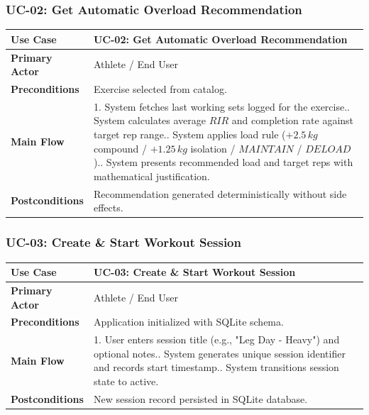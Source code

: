 \subsubsection{UC-02: Get Automatic Overload Recommendation}
\begin{table}[h!]
\centering
\small
\begin{tabularx}{\textwidth}{l X}
\toprule
\textbf{Use Case} & \textbf{UC-02: Get Automatic Overload Recommendation} \\
\midrule
\textbf{Primary Actor} & Athlete / End User \\
\textbf{Preconditions} & Exercise selected from catalog. \\
\textbf{Main Flow} & 
1. System fetches last working sets logged for the exercise.\newline
2. System calculates average $RIR$ and completion rate against target rep range.\newline
3. System applies load rule ($+2.5\,kg$ compound / $+1.25\,kg$ isolation / $MAINTAIN$ / $DELOAD$).\newline
4. System presents recommended load and target reps with mathematical justification. \\
\textbf{Postconditions} & Recommendation generated deterministically without side effects. \\
\bottomrule
\end{tabularx}
\end{table}

\subsubsection{UC-03: Create \& Start Workout Session}
\begin{table}[h!]
\centering
\small
\begin{tabularx}{\textwidth}{l X}
\toprule
\textbf{Use Case} & \textbf{UC-03: Create \& Start Workout Session} \\
\midrule
\textbf{Primary Actor} & Athlete / End User \\
\textbf{Preconditions} & Application initialized with SQLite schema. \\
\textbf{Main Flow} & 
1. User enters session title (e.g., "Leg Day - Heavy") and optional notes.\newline
2. System generates unique session identifier and records start timestamp.\newline
3. System transitions session state to active. \\
\textbf{Postconditions} & New session record persisted in SQLite database. \\
\bottomrule
\end{tabularx}
\end{table}

